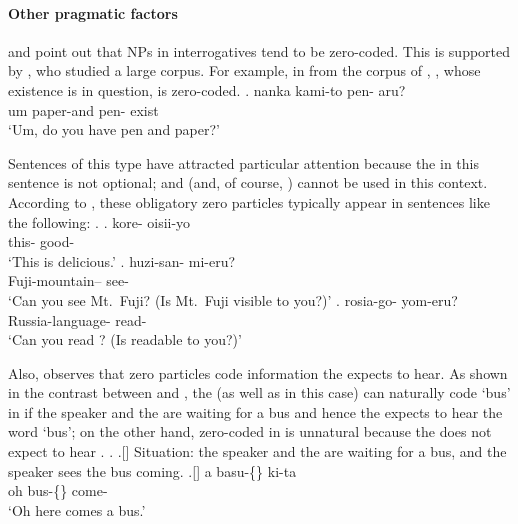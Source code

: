 




\paragraph{Other pragmatic factors}
\hspace*{-3mm}
and
point out that
NPs in interrogatives tend to be zero-coded.
This is supported by ,
who studied a large corpus.
For example,
in \Next from the corpus of ,
, whose existence is in question, is zero-coded.
%
\exg. nanka kami-to pen-\EM{\O} aru? \\
      um paper-and pen-\ci{\O} exist \\
      `Um, do you have pen and paper?'
      \hfill{\cite[120]{fry01}}

Sentences of this type have attracted particular attention
because the  in this sentence is not optional;
 and  (and, of course, ) cannot be used in this context.
According to ,
these obligatory zero particles typically appear in sentences like
the following:
%
\ex.
 \ag. kore-\EM{\O} oisii-yo \\
      this-\ci{\O} good- \\
      `This is delicious.'
 \bg. huzi-san-\EM{\O} mi-eru? \\
      Fuji-mountain--\ci{\O} see- \\
      `Can you see Mt.~Fuji? (Is Mt.~Fuji visible to you?)'
 \bg. rosia-go-\EM{\O} yom-eru? \\
      Russia-language-\ci{\O} read- \\
      `Can you read ? (Is  readable to you?)'
      \hfill{\cite[48]{onoe87}}


Also,  observes that
zero particles code information the  expects to hear.
As shown in the contrast between \Next and \NNext,
the  (as well as  in this case) can naturally code  `bus' in \Next
if the speaker and the  are waiting for a bus and hence
the  expects to hear the word  `bus';
on the other hand,
zero-coded  in \NNext is unnatural
because the  does not expect to hear .
%
\ex.
 \a.[] Situation: the speaker and the  are waiting for a bus,
       and the speaker sees the bus coming.
 \bg.[] a basu-\{\} ki-ta \\
      oh bus-\{\} come- \\
      `Oh here comes a bus.'
      \hfill{\cite[120]{tsutsui84}}

